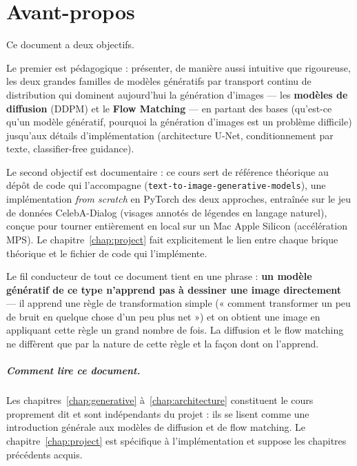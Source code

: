 \chapter*{Avant-propos}

Ce document a deux objectifs.

Le premier est pédagogique : présenter, de manière aussi intuitive que rigoureuse, les deux grandes
familles de modèles génératifs par transport continu de distribution qui dominent aujourd'hui la
génération d'images — les \textbf{modèles de diffusion} (DDPM) et le \textbf{Flow Matching} — en
partant des bases (qu'est-ce qu'un modèle génératif, pourquoi la génération d'images est un problème
difficile) jusqu'aux détails d'implémentation (architecture U-Net, conditionnement par texte,
classifier-free guidance).

Le second objectif est documentaire : ce cours sert de référence théorique au dépôt de code qui
l'accompagne (\texttt{text-\linebreak[1]to-\linebreak[1]image-\linebreak[1]generative-\linebreak[1]models}),
une implémentation \emph{from scratch} en PyTorch des deux approches, entraînée sur le jeu de données
CelebA-Dialog (visages annotés de légendes en langage
naturel), conçue pour tourner entièrement en local sur un Mac Apple Silicon (accélération MPS). Le
chapitre~\ref{chap:project} fait explicitement le lien entre chaque brique théorique et le fichier de
code qui l'implémente.

\begin{intuition}
Le fil conducteur de tout ce document tient en une phrase : \textbf{un modèle génératif de ce type
n'apprend pas à dessiner une image directement} — il apprend une règle de transformation simple
(« comment transformer un peu de bruit en quelque chose d'un peu plus net ») et on obtient une image
en appliquant cette règle un grand nombre de fois. La diffusion et le flow matching ne diffèrent que
par la nature de cette règle et la façon dont on l'apprend.
\end{intuition}

\paragraph{Comment lire ce document.} Les chapitres~\ref{chap:generative} à~\ref{chap:architecture}
constituent le cours proprement dit et sont indépendants du projet : ils se lisent comme une
introduction générale aux modèles de diffusion et de flow matching. Le chapitre~\ref{chap:project} est
spécifique à l'implémentation et suppose les chapitres précédents acquis.
